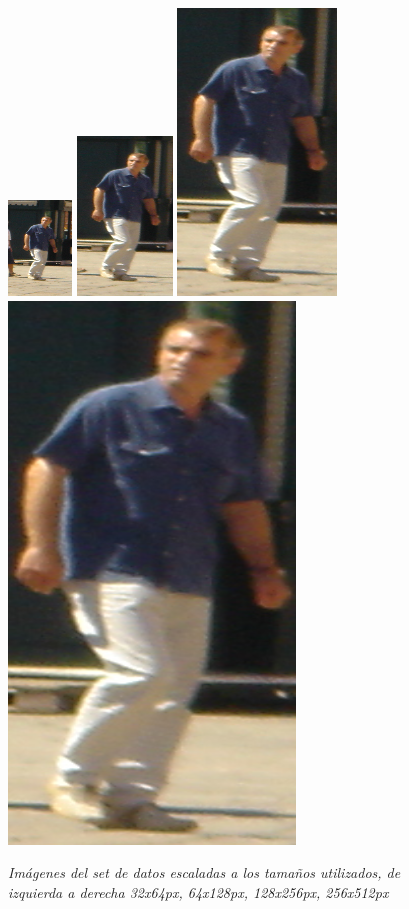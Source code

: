 \begin{figure}[htc]
  \centering
  \includegraphics[scale=.3]{images/32}
  \includegraphics[scale=.3]{images/64}
  \includegraphics[scale=.3]{images/128}
  \includegraphics[scale=.3]{images/256}
  \caption{\em Imágenes  del set de datos escaladas a los tamaños utilizados, de izquierda a derecha 32x64px, 64x128px, 128x256px, 256x512px}  
  \label{fig:imgescalas}
\end{figure}

